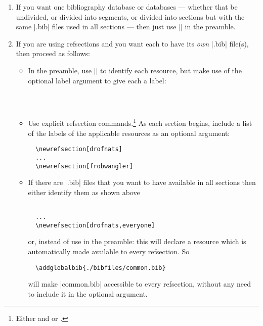 \begin{enumerate}
\item If you want one bibliography database or databases --- whether
  that be undivided, or divided into segments, or divided into
  sections but with the same |.bib| files used in all sections --- then
  just use || in the preamble.
\item If you are using refsections and you want each to have its
  \emph{own} |.bib| file(s), then proceed as follows:
  \begin{itemize}
  \item In the preamble, use || to identify each
    resource, but make use of the optional label argument to give each
    a label:
\begin{Verbatim}
  
  
\end{Verbatim}
\item Use explicit refsection commands.\footnote{Either
     and  or
    .} As each section begins, include a list of the
  labels of the applicable resources as an optional argument:
\begin{Verbatim}
  \newrefsection[drofnats]
  ...
  \newrefsection[frobwangler]
\end{Verbatim}
\item If there are |.bib| files that you want to have available in all
  sections then either identify them as shown above
\begin{Verbatim}
  
  ...
  \newrefsection[drofnats,everyone]
\end{Verbatim}
or, instead of  use
 in the preamble: this will
declare a resource which is automatically made available to every
refsection. So
\begin{Verbatim}
  \addglobalbib{./bibfiles/common.bib}
\end{Verbatim}
will make |common.bib| accessible to every refsection, without any
need to include it in the optional argument.
\end{itemize}
\end{enumerate}

